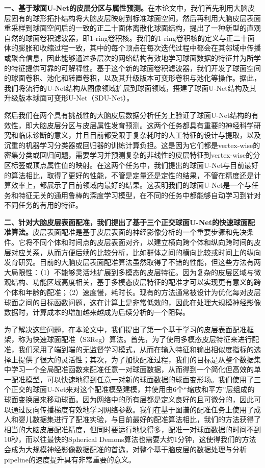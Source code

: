 \textbf{一、基于球面U-Net的皮层分区与属性预测。}在本论文中，我们首先利用大脑皮层固有的球形拓扑结构将大脑皮层映射到标准球面空间，然后再利用大脑皮层表面重采样到球面空间后的一致的正二十面体离散化球面结构，提出了一种新型的直观自然的球面卷积滤波器，即1-ring卷积核。我们的1-ring卷积核的定义与正二十面体的膨胀和收缩过程一致，其中的每个顶点在每次迭代过程中都会在其邻域中传播或聚合信息，因此能够通过多层次的网络结构有效地学习球面数据的特征并为所学的特征提供可靠的可解释性。基于这个新的球面卷积滤波器，我们开发了球面空间的球面卷积、池化和转置卷积，以及其升级版本可变形卷积与池化等操作。据此，我们将流行的U-Net结构\cite{ronneberger2015u}从图像领域扩展到球面领域，搭建了球面U-Net结构及其升级版本球面可变形U-Net（SDU-Net）。

然后我们在两个具有挑战性的大脑皮层数据分析任务上验证了球面U-Net结构的有效性，即大脑皮层分区与皮层属性发育预测。这两个任务都具有重要的神经科学研究和临床诊断的意义，并且目前都受限于复杂耗时的人工特征的设计与提取，以及沉重的机器学习分类器或回归器的训练计算负担。这是因为它们都是vertex-wise的密集分类或回归问题，需要学习并预测复杂的非线性的皮层特征到vertex-wise的分区标签或顶点属性值的映射。在这两个任务中，我们提出的球面U-Net与目前最好的算法相比，取得了更好的性能，不管是定量还是定性的结果，不管在精度还是计算效率上，都展示了目前领域内最好的结果。这表明我们的球面U-Net是一个与任务和特征无关的通用鲁棒的深度学习模型，在不同的任务中都能够自动学习到针对不同任务的有用的特征。

\textbf{二、针对大脑皮层表面配准，我们提出了基于三个正交球面U-Net的快速球面配准算法。}皮层表面配准是基于皮层表面的神经影像分析的一个重要步骤和先决条件。它将不同个体和时间点的皮层表面对齐，以建立横向跨个体和纵向跨时间的皮层对应关系，从而方便后续的比较分析，比如群体之间的横向比较或时间上的纵向发育研究。目前的大脑皮层表面配准算法虽然取得了不错的性能，但这些方法有两大局限性：（1）不能够灵活地扩展到多模态的皮层特征。因为复杂的皮层区域与微观结构、功能区域高度相关，基于多模态皮层特征的配准才可以实现更有意义的跨个体和年龄的配准；（2）速度慢，耗时长。现有的方法通常被设计为优化每对皮层球面之间的目标函数问题，这在计算上是非常低效的，因此在处理大规模神经影像数据时，计算成本的增加越来越成为后续分析的一个阻碍。

为了解决这些问题，在本论文中，我们提出了第一个基于学习的皮层表面配准框架，称为快速球面配准（S3Reg）算法。首先，为了使用多模态皮层特征来进行配准，我们采用了端到端的无监督学习模式，从而在输入特征和输出相似度指标的选择上提供了很大的灵活性；其次，为了加快配准过程，我们的目标是从整个数据集中学习一个全局配准函数来配准任意一对球面数据，从而得到一个简化但高效的单一配准模型，可以快速地得到任意一对新的球面数据的球面变形场。我们使用了三个正交的球面U-Net来对这个配准模型建模，并使用由6个“缩放和平方”层组成的球面变换层来移动球面。因为网络中的所有层都是定义良好的且可微分的，因此可以通过反向传播梯度有效地学习网络参数。我们在基于图谱的配准任务上使用了成人和婴儿数据集进行了配准实验，与目前最好的配准算法相比，我们的方法获得了相当的大脑皮层配准精度，但同时要运行地快得多，配准一对球面数据的时间不到10秒，而以往最快的Spherical Demons算法也需要大约1分钟，这使得我们的方法会成为大规模神经影像数据配准的首选，对整个基于脑皮层的数据处理与分析pipeline的速度提升具有非常重要的意义。

